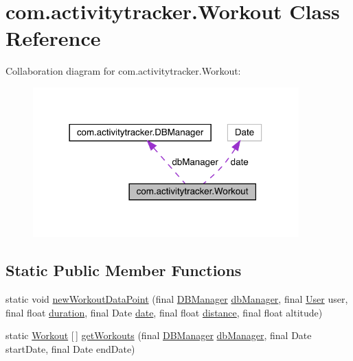 \hypertarget{classcom_1_1activitytracker_1_1_workout}{}\section{com.\+activitytracker.\+Workout Class Reference}
\label{classcom_1_1activitytracker_1_1_workout}


Collaboration diagram for com.\+activitytracker.\+Workout\+:\nopagebreak
\begin{figure}[H]
\begin{center}
\leavevmode
\includegraphics[width=290pt]{classcom_1_1activitytracker_1_1_workout__coll__graph}
\end{center}
\end{figure}
\subsection*{Static Public Member Functions}
\begin{DoxyCompactItemize}
\item 
static void \mbox{\hyperlink{classcom_1_1activitytracker_1_1_workout_aa595f618a20c8e98bb96c221c5158e9a}{new\+Workout\+Data\+Point}} (final \mbox{\hyperlink{classcom_1_1activitytracker_1_1_d_b_manager}{D\+B\+Manager}} \mbox{\hyperlink{classcom_1_1activitytracker_1_1_workout_a992aa5129fbae42bc1e18273826631e2}{db\+Manager}}, final \mbox{\hyperlink{classcom_1_1activitytracker_1_1_user}{User}} user, final float \mbox{\hyperlink{classcom_1_1activitytracker_1_1_workout_ad21c7ace0611f0159d087d68ad950b8e}{duration}}, final Date \mbox{\hyperlink{classcom_1_1activitytracker_1_1_workout_a6b9fd61b438393f81296d43cd2c7820a}{date}}, final float \mbox{\hyperlink{classcom_1_1activitytracker_1_1_workout_a3c90aaba800c15e1a487af2ff5623c63}{distance}}, final float altitude)
\item 
static \mbox{\hyperlink{classcom_1_1activitytracker_1_1_workout}{Workout}} \mbox{[}$\,$\mbox{]} \mbox{\hyperlink{classcom_1_1activitytracker_1_1_workout_a822ea171fb097e7ffaebe436ae503e80}{get\+Workouts}} (final \mbox{\hyperlink{classcom_1_1activitytracker_1_1_d_b_manager}{D\+B\+Manager}} \mbox{\hyperlink{classcom_1_1activitytracker_1_1_workout_a992aa5129fbae42bc1e18273826631e2}{db\+Manager}}, final Date start\+Date, final Date end\+Date)
\end{DoxyCompactItemize}
